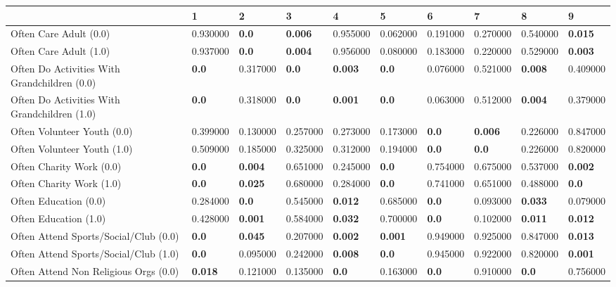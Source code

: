 \begin{tabular}{llllllllll}
\toprule
 & 1 & 2 & 3 & 4 & 5 & 6 & 7 & 8 & 9 \\
\midrule
Often Care Adult (0.0) & 0.930000 & \textbf{0.0} & \textbf{0.006} & 0.955000 & 0.062000 & 0.191000 & 0.270000 & 0.540000 & \textbf{0.015} \\
Often Care Adult (1.0) & 0.937000 & \textbf{0.0} & \textbf{0.004} & 0.956000 & 0.080000 & 0.183000 & 0.220000 & 0.529000 & \textbf{0.003} \\
Often Do Activities With Grandchildren (0.0) & \textbf{0.0} & 0.317000 & \textbf{0.0} & \textbf{0.003} & \textbf{0.0} & 0.076000 & 0.521000 & \textbf{0.008} & 0.409000 \\
Often Do Activities With Grandchildren (1.0) & \textbf{0.0} & 0.318000 & \textbf{0.0} & \textbf{0.001} & \textbf{0.0} & 0.063000 & 0.512000 & \textbf{0.004} & 0.379000 \\
Often Volunteer Youth (0.0) & 0.399000 & 0.130000 & 0.257000 & 0.273000 & 0.173000 & \textbf{0.0} & \textbf{0.006} & 0.226000 & 0.847000 \\
Often Volunteer Youth (1.0) & 0.509000 & 0.185000 & 0.325000 & 0.312000 & 0.194000 & \textbf{0.0} & \textbf{0.0} & 0.226000 & 0.820000 \\
Often Charity Work (0.0) & \textbf{0.0} & \textbf{0.004} & 0.651000 & 0.245000 & \textbf{0.0} & 0.754000 & 0.675000 & 0.537000 & \textbf{0.002} \\
Often Charity Work (1.0) & \textbf{0.0} & \textbf{0.025} & 0.680000 & 0.284000 & \textbf{0.0} & 0.741000 & 0.651000 & 0.488000 & \textbf{0.0} \\
Often Education (0.0) & 0.284000 & \textbf{0.0} & 0.545000 & \textbf{0.012} & 0.685000 & \textbf{0.0} & 0.093000 & \textbf{0.033} & 0.079000 \\
Often Education (1.0) & 0.428000 & \textbf{0.001} & 0.584000 & \textbf{0.032} & 0.700000 & \textbf{0.0} & 0.102000 & \textbf{0.011} & \textbf{0.012} \\
Often Attend Sports/Social/Club (0.0) & \textbf{0.0} & \textbf{0.045} & 0.207000 & \textbf{0.002} & \textbf{0.001} & 0.949000 & 0.925000 & 0.847000 & \textbf{0.013} \\
Often Attend Sports/Social/Club (1.0) & \textbf{0.0} & 0.095000 & 0.242000 & \textbf{0.008} & \textbf{0.0} & 0.945000 & 0.922000 & 0.820000 & \textbf{0.001} \\
Often Attend Non Religious Orgs (0.0) & \textbf{0.018} & 0.121000 & 0.135000 & \textbf{0.0} & 0.163000 & \textbf{0.0} & 0.910000 & \textbf{0.0} & 0.756000 \\

\end{tabular}
